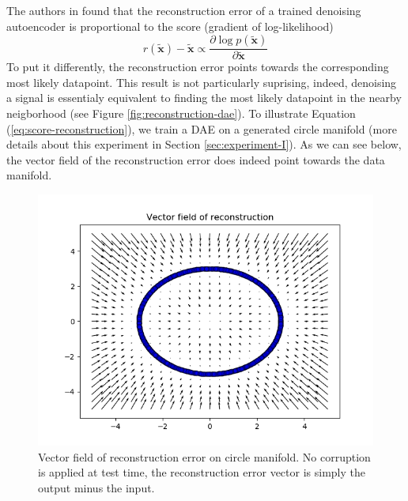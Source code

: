 The authors in \citep{alainbengio} found that the reconstruction error of a trained denoising autoencoder is proportional to the score (gradient of log-likelihood)
\begin{equation}
r(\tilde{\mathbf{x}}) - \tilde{\mathbf{x}} \propto \frac{\partial \log p(\tilde{\mathbf{x}})}{\partial \tilde{\mathbf{x}}} 
\label{eq:score-reconstruction}
\end{equation} 
To put it differently, the reconstruction error points towards the corresponding most likely datapoint. This result is not particularly suprising, indeed, denoising a signal is essentialy equivalent to finding the most likely datapoint in the nearby neigborhood (see Figure \ref{fig:reconstruction-dae}). To illustrate Equation (\ref{eq:score-reconstruction}), we train a DAE on a generated circle manifold (more details about this experiment in Section \ref{sec:experiment-I}). As we can see below, the vector field of the reconstruction error does indeed point towards the data manifold.
\begin{figure}[!h]
\centering
\includegraphics[scale=0.6]{figures/circle-vector-field}
\caption[Vector field circle manifold]{Vector field of reconstruction error on circle manifold. No corruption is applied at test time, the reconstruction error vector is simply the output minus the input.}
\label{fig:vf-circle}
\end{figure}

